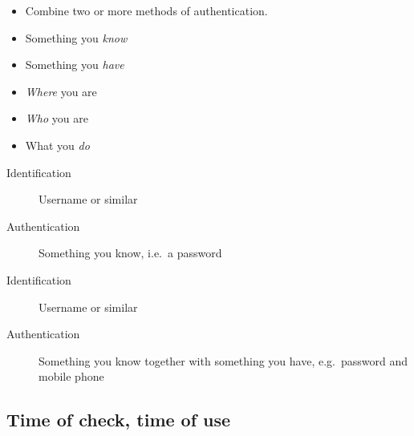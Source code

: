 \begin{frame}
  \begin{definition}
    \begin{itemize}
      \item Combine two or more methods of authentication.
    \end{itemize}
  \end{definition}

  \begin{example}
    \begin{itemize}
      \item Something you \emph{know}
      \item Something you \emph{have}
      \item \emph{Where} you are
      \item \emph{Who} you are
      \item What you \emph{do}
    \end{itemize}
  \end{example}
\end{frame}

\begin{frame}
  \begin{example}
    \begin{description}
      \item[Identification] Username or similar
      \item[Authentication] Something you know, i.e.\ a password
    \end{description}
  \end{example}

  \pause{}

  \begin{example}
    \begin{description}
      \item[Identification] Username or similar
      \item[Authentication] Something you know together with something you 
        have, e.g.\ password and mobile phone
    \end{description}
  \end{example}
\end{frame}

\subsection{Time of check, time of use}

